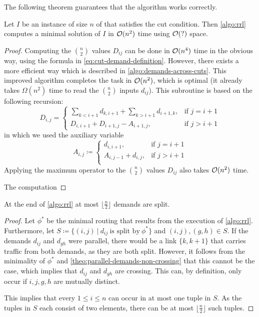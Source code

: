 The following theorem guarantees that the algorithm works correctly.
\begin{theorem}
	\label{theo:rll-algo-correct}
	Let $I$ be an instance of size $n$ of \RRL that satisfies the cut condition.
	Then \cref{algo:rrl} computes a minimal solution of $I$ in $\mathcal{O}(n^2)$ time using $\mathcal{O}(?)$ space.
\end{theorem}
\begin{proof}
	Computing the $\binom{n}{2}$ values $D_{ij}$ can be done in $\mathcal{O}(n^4)$ time in the obvious way, using the formula in \cref{eq:cut-demand-definition}.
	However, there exists a more efficient way which is described in \cref{algo:demands-across-cuts}.
	This improved algorithm completes the task in $\mathcal{O}(n^2)$, which is optimal (it already takes $\Omega(n^2)$ time to read the $\binom{n}{2}$ inputs $d_{ij}$).
	This subroutine is based on the following recursion:
	\begin{equation}
		D_{i, j} = \begin{cases}
			\sum_{k < i+1} d_{k,i+1} + \sum_{k > i+1} d_{i+1, k}, & \text{if } j = i+1 \\
			D_{i, i+1} + D_{i+1, j} - A_{i+1, j}, & \text{if } j > i+1
		\end{cases}
	\end{equation}
	in which we used the auxiliary variable
	\begin{equation}
		A_{i, j} \coloneqq \begin{cases}
				d_{i, i+1}, & \text{if } j = i+1\\
				A_{i, j-1} + d_{i, j}, &\text{if } j > i+1\\
		\end{cases}
	\end{equation}
	Applying the maximum operator to the $\binom{n}{2}$ values $D_{ij}$ also takes $\mathcal{O}(n^2)$ time.
	
	The computation 
	
\end{proof}


\begin{lemma}
	At the end of \cref{algo:rrl} at most $\lfloor\frac{n}{2}\rfloor$ demands are split.
\end{lemma}
\begin{proof}
	Let $\phi^\ast$ be the minimal routing that results from the execution of \cref{algo:rrl}.
	Furthermore, let $S \coloneqq \{(i, j)\ |\ d_{ij}\ \text{is split by}\ \phi^\ast \}$ and $(i, j), (g, h) \in S$.
	If the demands $d_{ij}$ and $d_{gh}$ were parallel, there would be a link $\{k, k+1\}$ that carries traffic from both demands, as they are both split.
	However, it follows from the minimality of $\phi^\ast$ and \cref{theo:parallel-demands-non-crossing} that this cannot be the case, which implies that $d_{ij}$ and $d_{gh}$ are crossing.
	This can, by definition, only occur if $i, j, g, h$ are mutually distinct.
	
	This implies that every $1 \leq i \leq n$ can occur in at most one tuple in $S$.
	As the tuples in $S$ each consist of two elements, there can be at most $\lfloor\frac{n}{2}\rfloor$ such tuples.
\end{proof}